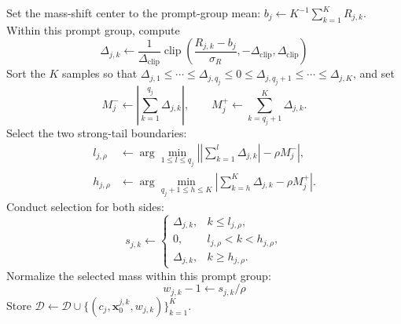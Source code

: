 \documentclass{article} %
\begin{document}
\begin{algorithm}[H]
\begin{algorithmic}[1]
                \State Set the mass-shift center to the prompt-group mean:
                $b_j\leftarrow K^{-1}\sum_{k=1}^{K}R_{j,k}$.
                \State Within this prompt group, compute
                \[
                    \Delta_{j,k}\leftarrow
                    \frac{1}{\Delta_{\mathrm{clip}}}
                    \operatorname{clip}\!\left(
                        \frac{R_{j,k}-b_j}{\sigma_R},
                        -\Delta_{\mathrm{clip}},
                        \Delta_{\mathrm{clip}}
                    \right)
                \]
                \State Sort the $K$ samples so that
                $\Delta_{j,1}\le\cdots\le\Delta_{j,q_j}\le0
                \le\Delta_{j,q_j+1}\le\cdots\le\Delta_{j,K}$, and set
                \[
                    M_j^-\leftarrow\left|\sum_{k=1}^{q_j}\Delta_{j,k}\right|,
                    \qquad
                    M_j^+\leftarrow\sum_{k=q_j+1}^{K}\Delta_{j,k}.
                \]
                \State Select the two strong-tail boundaries:
                \[
                    \begin{aligned}
                        l_{j,\rho}&\leftarrow
                        \arg\min_{1\le l\le q_j}
                        \left|\left|\sum_{k=1}^{l}\Delta_{j,k}\right|
                        -\rho M_j^-\right|,\\
                        h_{j,\rho}&\leftarrow
                        \arg\min_{q_j+1\le h\le K}
                        \left|\sum_{k=h}^{K}\Delta_{j,k}
                        -\rho M_j^+\right|.
                    \end{aligned}
                \]
                \State Conduct selection for both sides:
                \[
                    s_{j,k}\leftarrow
                    \begin{cases}
                        \Delta_{j,k},&k\le l_{j,\rho},\\
                        0,&l_{j,\rho}<k<h_{j,\rho},\\
                        \Delta_{j,k},&k\ge h_{j,\rho}.
                    \end{cases}
                \]
                \State Normalize the selected mass within this prompt group:
                \[
                    w_{j,k}-1\leftarrow s_{j,k}/\rho
                \]
                \State Store
                $\mathcal{D}\leftarrow\mathcal{D}\cup
                \{(c_j,\mathbf{x}_0^{j,k},w_{j,k})\}_{k=1}^{K}$.
            \EndFor


\end{algorithmic}
\end{algorithm}
\end{document}
